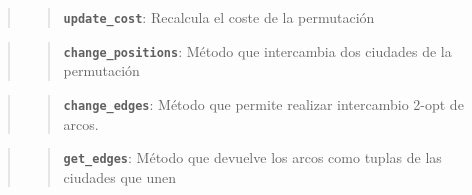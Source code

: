 \documentclass{article}
\begin{document}
\begin{quote}
\begin{quote}
\textbf{\texttt{update\_cost}}:  Recalcula el coste de la
permutación
\end{quote}
\end{quote}

\begin{quote}
\begin{quote}
\textbf{\texttt{change\_positions}}:  Método que
intercambia dos ciudades de la permutación
\end{quote}
\end{quote}

\begin{quote}
\begin{quote}
\textbf{\texttt{change\_edges}}:  Método que permite
realizar intercambio 2-opt de arcos.
\end{quote}
\end{quote}

\begin{quote}
\begin{quote}
\textbf{\texttt{get\_edges}}:  Método que devuelve los
arcos como tuplas de las ciudades que unen
\end{quote}
\end{quote}
\end{document}
